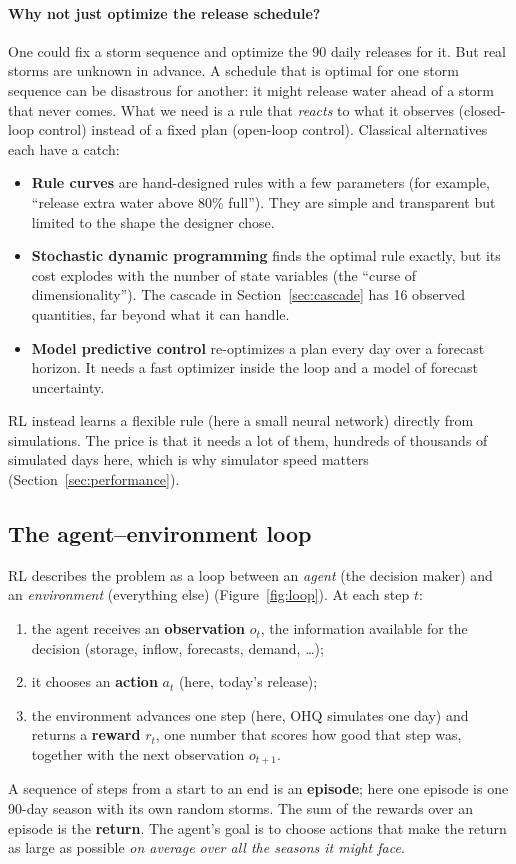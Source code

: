 \paragraph{Why not just optimize the release schedule?} One could fix a
storm sequence and optimize the 90 daily releases for it. But real storms
are unknown in advance. A schedule that is optimal for one storm sequence
can be disastrous for another: it might release water ahead of a storm that
never comes. What we need is a rule that \emph{reacts} to what it observes
(closed-loop control) instead of a fixed plan (open-loop control). Classical
alternatives each have a catch:
\begin{itemize}\itemsep1pt
\item \textbf{Rule curves} are hand-designed rules with a few parameters
(for example, ``release extra water above 80\% full''). They are simple and
transparent but limited to the shape the designer chose.
\item \textbf{Stochastic dynamic programming} finds the optimal rule
exactly, but its cost explodes with the number of state variables (the
``curse of dimensionality''). The cascade in Section~\ref{sec:cascade} has
16 observed quantities, far beyond what it can handle.
\item \textbf{Model predictive control} re-optimizes a plan every day over
a forecast horizon. It needs a fast optimizer inside the loop and a model
of forecast uncertainty.
\end{itemize}
RL instead learns a flexible rule (here a small neural network) directly
from simulations. The price is that it needs a lot of them, hundreds of
thousands of simulated days here, which is why simulator speed matters
(Section~\ref{sec:performance}).

\subsection{The agent--environment loop}
RL describes the problem as a loop between an \emph{agent} (the decision
maker) and an \emph{environment} (everything else) (Figure~\ref{fig:loop}).
At each step $t$:
\begin{enumerate}\itemsep1pt
\item the agent receives an \textbf{observation} $o_t$, the information
available for the decision (storage, inflow, forecasts, demand, \dots);
\item it chooses an \textbf{action} $a_t$ (here, today's release);
\item the environment advances one step (here, OHQ simulates one day) and
returns a \textbf{reward} $r_t$, one number that scores how good that step
was, together with the next observation $o_{t+1}$.
\end{enumerate}
A sequence of steps from a start to an end is an \textbf{episode}; here one
episode is one 90-day season with its own random storms. The sum of the
rewards over an episode is the \textbf{return}. The agent's goal is to
choose actions that make the return as large as possible \emph{on average
over all the seasons it might face}.

